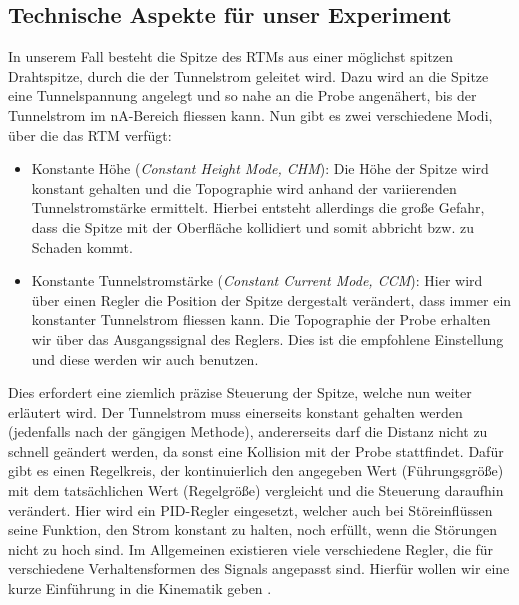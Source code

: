 
\subsection{Technische Aspekte für unser Experiment}
In unserem Fall besteht die Spitze des RTMs aus einer möglichst spitzen
Drahtspitze, durch die der Tunnelstrom geleitet wird. Dazu wird an die Spitze eine
Tunnelspannung angelegt und so nahe an die Probe angenähert, bis der Tunnelstrom
im nA-Bereich fliessen kann.
Nun gibt es zwei verschiedene Modi, über die das RTM verfügt:
\begin{itemize}
\item Konstante Höhe (\textit{Constant Height Mode, CHM}): Die Höhe der Spitze wird konstant
gehalten und die Topographie wird anhand der variierenden Tunnelstromstärke ermittelt. Hierbei
entsteht allerdings die große Gefahr, dass die Spitze mit der Oberfläche kollidiert und somit
abbricht bzw. zu Schaden kommt.
\item Konstante Tunnelstromstärke (\textit{Constant Current Mode, CCM}): Hier wird über einen
Regler die Position der Spitze dergestalt verändert, dass immer ein konstanter Tunnelstrom
fliessen kann. Die Topographie der Probe erhalten wir über das Ausgangssignal des Reglers.
Dies ist die empfohlene Einstellung und diese werden wir auch benutzen.
\end{itemize}
Dies erfordert eine ziemlich präzise Steuerung der Spitze, welche nun weiter erläutert wird.
Der Tunnelstrom muss einerseits konstant gehalten werden (jedenfalls nach der gängigen Methode),
andererseits darf die Distanz nicht zu schnell geändert werden, da sonst eine Kollision mit der
Probe stattfindet. Dafür gibt es einen Regelkreis, der kontinuierlich den angegeben Wert
(Führungsgröße) mit dem
tatsächlichen Wert (Regelgröße) vergleicht und
die Steuerung daraufhin verändert. Hier wird ein PID-Regler
eingesetzt, welcher auch bei Störeinflüssen seine Funktion, den Strom konstant zu halten,
noch erfüllt, wenn die Störungen nicht zu hoch sind. Im Allgemeinen existieren viele
verschiedene Regler, die für verschiedene Verhaltensformen des Signals angepasst sind.
Hierfür wollen wir eine kurze Einführung in die Kinematik geben \cite{regelungstechnik}.
